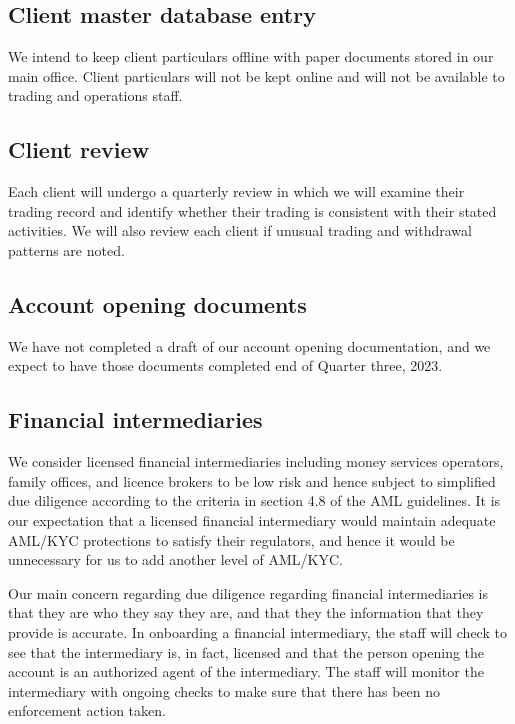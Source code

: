 \subsection{Client master database entry}
We intend to keep client particulars offline with paper documents
stored in our main office.  Client particulars will not be kept online
and will not be available to trading and operations staff.

\subsection{Client review}
Each client will undergo a quarterly review in which we will examine
their trading record and identify whether their trading is
consistent with their stated activities.  We will also review each
client if unusual trading and withdrawal patterns are noted.

\subsection{Account opening documents}
We have not completed a draft of our account opening documentation, and
we expect to have those documents completed end of Quarter three, 2023.

\subsection{Financial intermediaries}

We consider licensed financial intermediaries including money services
operators, family offices, and licence brokers to be low risk and
hence subject to simplified due diligence according to the criteria in
section 4.8 of the AML guidelines.  It is our expectation that a
licensed financial intermediary would maintain adequate AML/KYC
protections to satisfy their regulators, and hence it would be
unnecessary for us to add another level of AML/KYC.

Our main concern regarding due diligence regarding financial
intermediaries is that they are who they say they are, and that they
the information that they provide is accurate.  In onboarding a
financial intermediary, the staff will check to see that the
intermediary is, in fact, licensed and that the person opening the
account is an authorized agent of the intermediary.  The staff will
monitor the intermediary with ongoing checks to make sure that there
has been no enforcement action taken.

